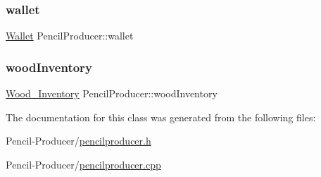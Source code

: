 \subsubsection{\texorpdfstring{wallet}{wallet}}
{\footnotesize\ttfamily \mbox{\hyperlink{classWallet}{Wallet}} Pencil\+Producer\+::wallet\hspace{0.3cm}{\ttfamily [private]}}

\mbox{\label{classPencilProducer_ac0454fe420705b3e3e922661e89ecee0}} 
\subsubsection{\texorpdfstring{woodInventory}{woodInventory}}
{\footnotesize\ttfamily \mbox{\hyperlink{classWood__Inventory}{Wood\+\_\+\+Inventory}} Pencil\+Producer\+::wood\+Inventory\hspace{0.3cm}{\ttfamily [private]}}



The documentation for this class was generated from the following files\+:\begin{DoxyCompactItemize}
\item 
Pencil-\/\+Producer/\mbox{\hyperlink{pencilproducer_8h}{pencilproducer.\+h}}\item 
Pencil-\/\+Producer/\mbox{\hyperlink{pencilproducer_8cpp}{pencilproducer.\+cpp}}\end{DoxyCompactItemize}
